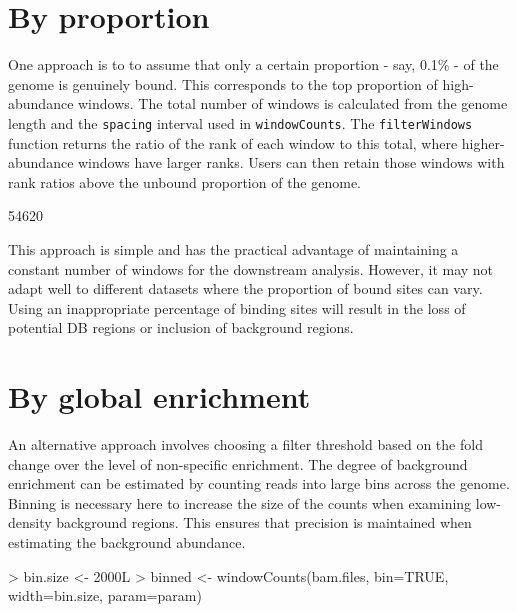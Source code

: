 \documentclass[12pt]{report}
\renewenvironment{Schunk}{\vspace{0pt}}{\vspace{0pt}}
\newcommand{\code}[1]{{\small\texttt{#1}}}
\begin{document}
\section{By proportion}
One approach is to to assume that only a certain proportion - say, 0.1\% - of the genome is genuinely bound. 
This corresponds to the top proportion of high-abundance windows.
The total number of windows is calculated from the genome length and the \code{spacing} interval used in \code{windowCounts}. 
The \code{filterWindows} function returns the ratio of the rank of each window to this total, where higher-abundance windows have larger ranks.
Users can then retain those windows with rank ratios above the unbound proportion of the genome.

\begin{Schunk}
\begin{Soutput}
[1] 54620
\end{Soutput}
\end{Schunk}

This approach is simple and has the practical advantage of maintaining a constant number of windows for the downstream analysis. 
However, it may not adapt well to different datasets where the proportion of bound sites can vary.
Using an inappropriate percentage of binding sites will result in the loss of potential DB regions or inclusion of background regions.

\section{By global enrichment}
\label{sec:global_filter}
An alternative approach involves choosing a filter threshold based on the fold change over the level of non-specific enrichment.
The degree of background enrichment can be estimated by counting reads into large bins across the genome.
Binning is necessary here to increase the size of the counts when examining low-density background regions. 
This ensures that precision is maintained when estimating the background abundance.

\begin{Schunk}
\begin{Sinput}
> bin.size <- 2000L
> binned <- windowCounts(bam.files, bin=TRUE, width=bin.size, param=param)
\end{Sinput}
\end{Schunk}
\end{document}
